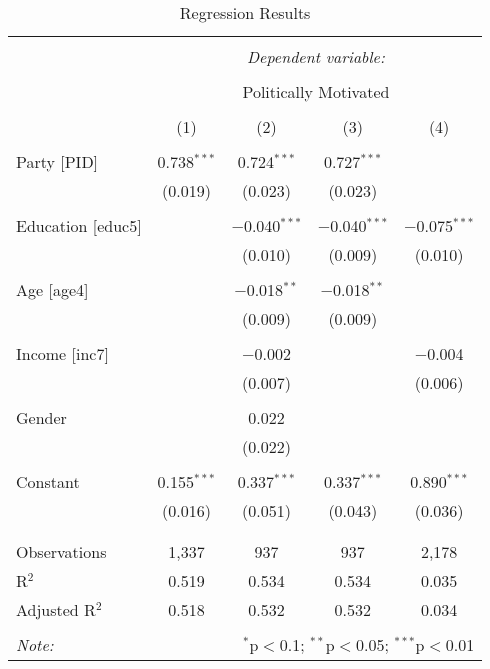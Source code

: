 
\begin{table}[!htbp] \centering 
  \caption{Regression Results} 
  \label{} 
\begin{tabular}{@{\extracolsep{5pt}}lcccc} 
\\[-1.8ex]\hline 
\hline \\[-1.8ex] 
 & \multicolumn{4}{c}{\textit{Dependent variable:}} \\ 
\cline{2-5} 
\\[-1.8ex] & \multicolumn{4}{c}{Politically Motivated} \\ 
\\[-1.8ex] & (1) & (2) & (3) & (4)\\ 
\hline \\[-1.8ex] 
 Party [PID] & 0.738$^{***}$ & 0.724$^{***}$ & 0.727$^{***}$ &  \\ 
  & (0.019) & (0.023) & (0.023) &  \\ 
  & & & & \\ 
 Education [educ5] &  & $-$0.040$^{***}$ & $-$0.040$^{***}$ & $-$0.075$^{***}$ \\ 
  &  & (0.010) & (0.009) & (0.010) \\ 
  & & & & \\ 
 Age [age4] &  & $-$0.018$^{**}$ & $-$0.018$^{**}$ &  \\ 
  &  & (0.009) & (0.009) &  \\ 
  & & & & \\ 
 Income [inc7] &  & $-$0.002 &  & $-$0.004 \\ 
  &  & (0.007) &  & (0.006) \\ 
  & & & & \\ 
 Gender &  & 0.022 &  &  \\ 
  &  & (0.022) &  &  \\ 
  & & & & \\ 
 Constant & 0.155$^{***}$ & 0.337$^{***}$ & 0.337$^{***}$ & 0.890$^{***}$ \\ 
  & (0.016) & (0.051) & (0.043) & (0.036) \\ 
  & & & & \\ 
\hline \\[-1.8ex] 
Observations & 1,337 & 937 & 937 & 2,178 \\ 
R$^{2}$ & 0.519 & 0.534 & 0.534 & 0.035 \\ 
Adjusted R$^{2}$ & 0.518 & 0.532 & 0.532 & 0.034 \\ 
\hline 
\hline \\[-1.8ex] 
\textit{Note:}  & \multicolumn{4}{r}{$^{*}$p$<$0.1; $^{**}$p$<$0.05; $^{***}$p$<$0.01} \\ 
\end{tabular} 
\end{table} 
